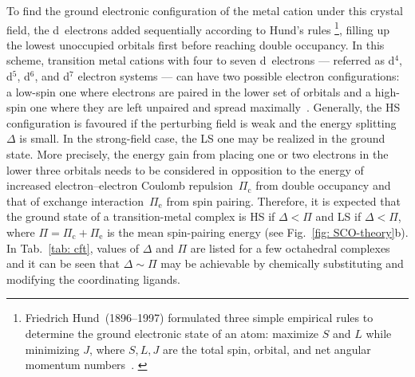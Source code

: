 To find the ground electronic configuration of the metal cation under this crystal field,
the d~electrons added sequentially according to Hund's rules%
\footnote{Friedrich Hund~(1896--1997) formulated three simple empirical rules to determine
the ground electronic state of an atom: maximize $S$ and $L$ while minimizing $J$,
where $S, L, J$ are the total spin, orbital, and net angular momentum numbers~\cite{Hund1925}.
\label{fn: Hund}},
filling up the lowest unoccupied orbitals first before reaching double occupancy.
%
In this scheme, transition metal cations with four to seven d~electrons ---
referred as d$^4$, d$^5$, d$^6$, and d$^7$ electron systems ---
can have two possible electron configurations:
a low-spin one where electrons are paired in the lower set of orbitals
and a high-spin one where they are left unpaired and spread maximally~\cite{Griffith1957}.
%
Generally, the HS configuration is favoured if the perturbing field is weak and
the energy splitting~$\Delta$ is small.
In the strong-field case, the LS one may be realized in the ground state.
%
More precisely, the energy gain from placing one or two electrons in the lower three orbitals
needs to be considered in opposition to
the energy of increased electron--electron Coulomb repulsion~$\Pi_\text{c}$ from double occupancy
and that of exchange interaction~$\Pi_\text{e}$ from spin pairing.
%
Therefore, it is expected that the ground state of a transition-metal complex
is HS if $\Delta < \Pi$ and LS if $\Delta < \Pi$, where $\Pi = \Pi_\text{c} + \Pi_\text{e}$
is the mean spin-pairing energy (see Fig.~\ref{fig: SCO-theory}b).
%
In Tab.~\ref{tab: cft}, values of $\Delta$ and $\Pi$ are listed for a few octahedral complexes
and it can be seen that $\Delta \sim \Pi$ may be achievable
by chemically substituting and modifying the coordinating ligands.
%
